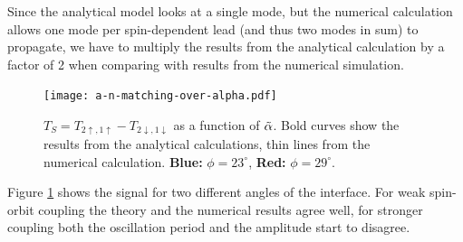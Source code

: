 Since the analytical model looks at a single mode, but the numerical
calculation allows one mode per spin-dependent lead (and thus two modes in
sum) to propagate, we have to multiply the results from the analytical
calculation by a factor of 2 when comparing with results from the numerical
simulation.

\begin{figure}
    \begin{center}
        \texttt{[image: a-n-matching-over-alpha.pdf]}
    \end{center}
    \caption{$T_S = T_{2\uparrow,1\uparrow} - T_{2\downarrow,1\downarrow}$ as
        a function of $\tilde \alpha$. Bold curves show the results from the analytical
        calculations, thin lines from the numerical calculation.
        \textbf{Blue:} $\phi = 23^\circ$, \textbf{Red:} $\phi = 29^\circ$.
    }
    \label{fig:a-n-matching-alpha}
\end{figure}

Figure \ref{fig:a-n-matching-alpha} shows the signal for two different
angles of the interface. For weak spin-orbit coupling the theory and the
numerical results agree well, for stronger coupling both the oscillation
period and the amplitude start to disagree.


